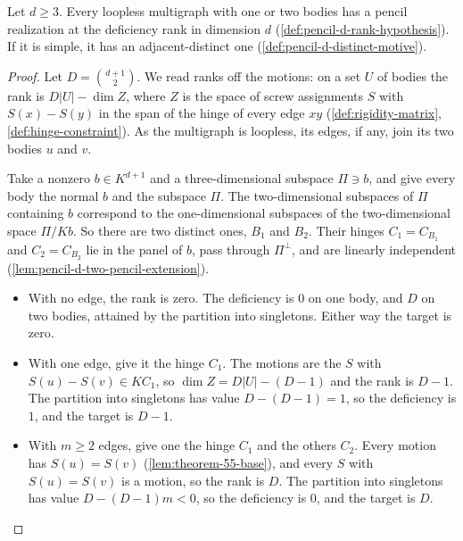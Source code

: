 \begin{lemma}
  \label{lem:pencil-d-base-case}
  \leanok
  Let $d \ge 3$. Every loopless multigraph with one or two bodies has a
  pencil realization at the deficiency rank in dimension $d$
  (\cref{def:pencil-d-rank-hypothesis}). If it is simple, it has an
  adjacent-distinct one (\cref{def:pencil-d-distinct-motive}).
\end{lemma}
\begin{proof}
  \leanok
  Let $D = \binom{d+1}{2}$. We read ranks off the motions: on a set $U$
  of bodies the rank is $D|U| - \dim Z$, where $Z$ is the space of
  screw assignments $S$ with $S(x) - S(y)$ in the span of the hinge of
  every edge $xy$ (\cref{def:rigidity-matrix},
  \cref{def:hinge-constraint}). As the multigraph is loopless, its
  edges, if any, join its two bodies $u$ and $v$.

  Take a nonzero $b \in K^{d+1}$ and a three-dimensional subspace
  $\Pi \ni b$, and give every body the normal $b$ and the subspace $\Pi$.
  The two-dimensional subspaces of $\Pi$ containing $b$ correspond to
  the one-dimensional subspaces of the two-dimensional space $\Pi / Kb$.
  So there are two distinct ones, $B_1$ and $B_2$. Their hinges
  $C_1 = C_{B_1}$ and $C_2 = C_{B_2}$ lie in the panel of $b$, pass
  through $\Pi^{\perp}$, and are linearly independent
  (\cref{lem:pencil-d-two-pencil-extension}).
  \begin{itemize}
    \item With no edge, the rank is zero. The deficiency is $0$ on one
      body, and $D$ on two bodies, attained by the partition into
      singletons. Either way the target is zero.
    \item With one edge, give it the hinge $C_1$. The motions are the
      $S$ with $S(u) - S(v) \in K C_1$, so $\dim Z = D|U| - (D - 1)$ and
      the rank is $D - 1$. The partition into singletons has value
      $D - (D - 1) = 1$, so the deficiency is $1$, and the target is
      $D - 1$.
    \item With $m \ge 2$ edges, give one the hinge $C_1$ and the others
      $C_2$. Every motion has $S(u) = S(v)$ (\cref{lem:theorem-55-base}),
      and every $S$ with $S(u) = S(v)$ is a motion, so the rank is $D$.
      The partition into singletons has value $D - (D - 1)m < 0$, so the
      deficiency is $0$, and the target is $D$.
  \end{itemize}


\end{proof}
